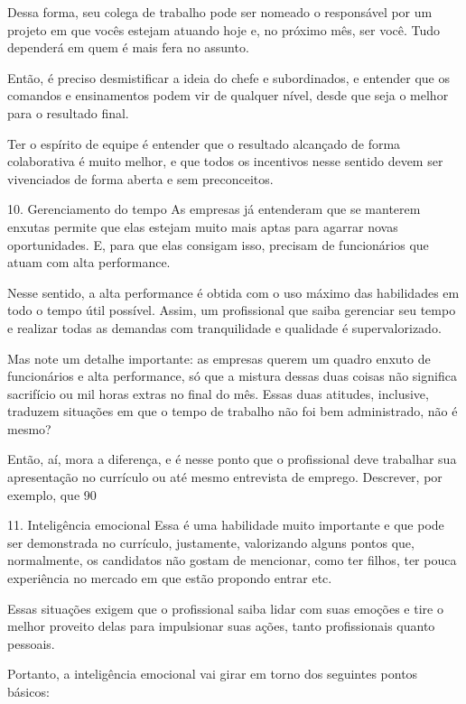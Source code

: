\begin{commentA}
Dessa forma, seu colega de trabalho pode ser nomeado o responsável por um projeto em que vocês estejam atuando hoje e, no próximo mês, ser você. Tudo dependerá em quem é mais fera no assunto.

Então, é preciso desmistificar a ideia do chefe e subordinados, e entender que os comandos e ensinamentos podem vir de qualquer nível, desde que seja o melhor para o resultado final.

Ter o espírito de equipe é entender que o resultado alcançado de forma colaborativa é muito melhor, e que todos os incentivos nesse sentido devem ser vivenciados de forma aberta e sem preconceitos.

10. Gerenciamento do tempo
As empresas já entenderam que se manterem enxutas permite que elas estejam muito mais aptas para agarrar novas oportunidades. E, para que elas consigam isso, precisam de funcionários que atuam com alta performance.

Nesse sentido, a alta performance é obtida com o uso máximo das habilidades em todo o tempo útil possível. Assim, um profissional que saiba gerenciar seu tempo e realizar todas as demandas com tranquilidade e qualidade é supervalorizado.

Mas note um detalhe importante: as empresas querem um quadro enxuto de funcionários e alta performance, só que a mistura dessas duas coisas não significa sacrifício ou mil horas extras no final do mês. Essas duas atitudes, inclusive, traduzem situações em que o tempo de trabalho não foi bem administrado, não é mesmo?

Então, aí, mora a diferença, e é nesse ponto que o profissional deve trabalhar sua apresentação no currículo ou até mesmo entrevista de emprego. Descrever, por exemplo, que 90%

11. Inteligência emocional
Essa é uma habilidade muito importante e que pode ser demonstrada no currículo, justamente, valorizando alguns pontos que, normalmente, os candidatos não gostam de mencionar, como ter filhos, ter pouca experiência no mercado em que estão propondo entrar etc.

Essas situações exigem que o profissional saiba lidar com suas emoções e tire o melhor proveito delas para impulsionar suas ações, tanto profissionais quanto pessoais.

Portanto, a inteligência emocional vai girar em torno dos seguintes pontos básicos:


\end{commentA}
